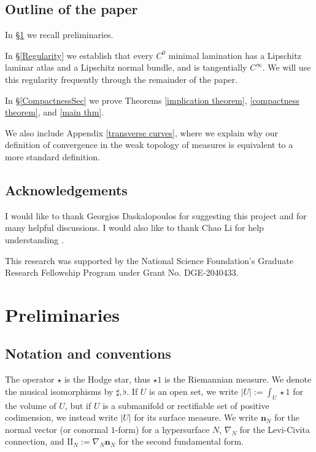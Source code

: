 \documentclass[final,12pt, leqno]{brownthesis}
\newcommand{\Two}{\mathrm{I\!I}}
\newcommand{\normal}{\mathbf n}
\theoremstyle{definition}
\numberwithin{equation}{section}
\begin{document}
\subsection{Outline of the paper}
In \S\ref{Prelims} we recall preliminaries.

In \S\ref{Regularity} we establish that every $C^0$ minimal lamination has a Lipschitz laminar atlas and a Lipschitz normal bundle, and is tangentially $C^\infty$.
We will use this regularity frequently through the remainder of the paper.

In \S\ref{CompactnessSec} we prove Theorems \ref{implication theorem}, \ref{compactness theorem}, and \ref{main thm}.

We also include Appendix \ref{transverse curves}, where we explain why our definition of convergence in the weak topology of measures is equivalent to a more standard definition.


\subsection{Acknowledgements}
I would like to thank Georgios Daskalopoulos for suggesting this project and for many helpful discussions.
I would also like to thank Chao Li for help understanding \cite{Chodosh2021}.

This research was supported by the National Science Foundation's Graduate Research Fellowship Program under Grant No. DGE-2040433.




\section{Preliminaries}\label{Prelims}
\subsection{Notation and conventions}
The operator $\star$ is the Hodge star, thus $\star 1$ is the Riemannian measure.
We denote the musical isomorphisms by $\sharp, \flat$.
If $U$ is an open set, we write $|U| := \int_U \star 1$ for the volume of $U$, but if $U$ is a submanifold or rectifiable set of positive codimension, we instead write $|U|$ for its surface measure.
We write $\normal_N$ for the normal vector (or conormal $1$-form) for a hypersurface $N$, $\nabla_N$ for the Levi-Civita connection, and $\Two_N := \nabla_N \normal_N$ for the second fundamental form.
\end{document}
